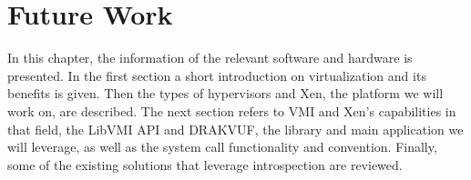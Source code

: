
\chapter{Future Work}\label{ch:chapter5}

In this chapter, the information of the relevant software and hardware is presented. In the first section a short introduction on virtualization and its benefits is given. Then the types of hypervisors and Xen, the platform we will work on, are described. The next section refers to \ac{VMI} and Xen's capabilities in that field, the LibVMI \ac{API} and DRAKVUF, the library and main application we will leverage, as well as the system call functionality and convention. Finally, some of the existing solutions that leverage introspection are reviewed.

